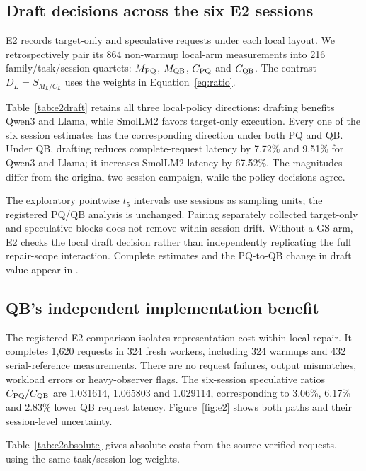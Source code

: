\subsection{Draft decisions across the six E2 sessions}
\label{sec:e2draft}
E2 records target-only and speculative requests under each local layout. We retrospectively pair its 864 non-warmup local-arm measurements into 216 family/task/session quartets: $M_{\mathrm{PQ}}$, $M_{\mathrm{QB}}$, $C_{\mathrm{PQ}}$ and $C_{\mathrm{QB}}$. The contrast $D_L=S_{M_L/C_L}$ uses the weights in Equation~\ref{eq:ratio}.



Table~\ref{tab:e2draft} retains all three local-policy directions: drafting benefits Qwen3 and Llama, while SmolLM2 favors target-only execution. Every one of the six session estimates has the corresponding direction under both PQ and QB. Under QB, drafting reduces complete-request latency by 7.72\% and 9.51\% for Qwen3 and Llama; it increases SmolLM2 latency by 67.52\%. The magnitudes differ from the original two-session campaign, while the policy decisions agree.

The exploratory pointwise $t_5$ intervals use sessions as sampling units; the registered PQ/QB analysis is unchanged. Pairing separately collected target-only and speculative blocks does not remove within-session drift. Without a GS arm, E2 checks the local draft decision rather than independently replicating the full repair-scope interaction. Complete estimates and the PQ-to-QB change in draft value appear in .

\subsection{QB's independent implementation benefit}
\label{sec:e2}
The registered E2 comparison isolates representation cost within local repair. It completes 1,620 requests in 324 fresh workers, including 324 warmups and 432 serial-reference measurements. There are no request failures, output mismatches, workload errors or heavy-observer flags. The six-session speculative ratios $C_{\mathrm{PQ}}/C_{\mathrm{QB}}$ are 1.031614, 1.065803 and 1.029114, corresponding to 3.06\%, 6.17\% and 2.83\% lower QB request latency. Figure~\ref{fig:e2} shows both paths and their session-level uncertainty.

Table~\ref{tab:e2absolute} gives absolute costs from the source-verified requests, using the same task/session log weights.
\begin{table}[t]\centering\small
\caption{Absolute E2 request costs (ms), with equal task and session weights in the geometric mean. Registered warmups are excluded; the paid interval includes submission, full-response parsing and endpoint validation.}\label{tab:e2absolute}

\end{table}

